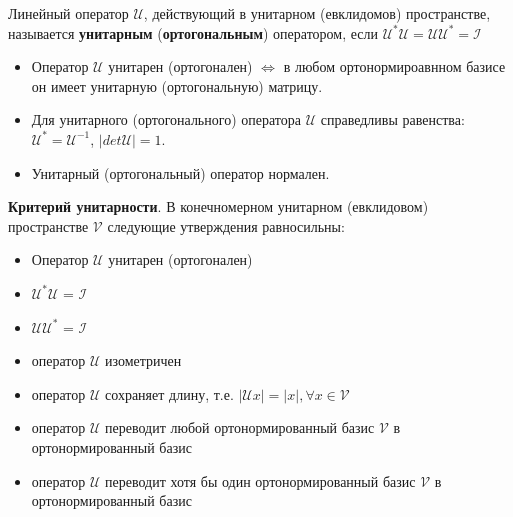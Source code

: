 Линейный оператор $\mathcal{U}$, действующий в унитарном (евклидомов) пространстве, называется \textbf{унитарным} (\textbf{ортогональным}) оператором, если $\mathcal{U}^*\mathcal{U} = \mathcal{U}\mathcal{U}^* = \mathcal{I}$
\begin{itemize}
\item Оператор $\mathcal{U}$ унитарен (ортогонален) $\iff$ в любом ортонормироавнном базисе он имеет унитарную (ортогональную) матрицу.
\item Для унитарного (ортогонального) оператора $\mathcal{U}$ справедливы равенства: \newline
$\mathcal{U}^* = \mathcal{U}^{-1}$, $|det\mathcal{U}| = 1$.
\item Унитарный (ортогональный) оператор нормален.
\end{itemize}

\textbf{Критерий унитарности}. В конечномерном унитарном (евклидовом) пространстве $\mathcal{V}$ следующие утверждения равносильны:
\begin{itemize}
\item Оператор $\mathcal{U}$ унитарен (ортогонален)
\item $\mathcal{U}^*\mathcal{U}$ = $\mathcal{I}$
\item $\mathcal{U}\mathcal{U}^*$ = $\mathcal{I}$
\item оператор $\mathcal{U}$ изометричен
\item оператор $\mathcal{U}$ сохраняет длину, т.е. $|\mathcal{U}x| = |x|, \forall x \in \mathcal{V}$
\item оператор $\mathcal{U}$ переводит любой ортонормированный базис $\mathcal{V}$ в ортонормированный базис
\item оператор $\mathcal{U}$ переводит хотя бы один ортонормированный базис $\mathcal{V}$ в ортонормированный базис
\end{itemize}


